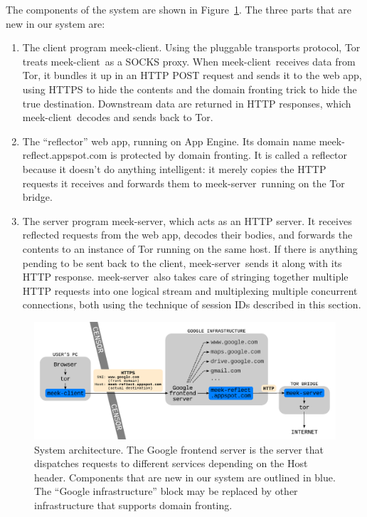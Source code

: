 \documentclass{article}
\def\meekclient{\mbox{meek-client}}
\def\meekserver{\mbox{meek-server}}
\begin{document}
The components of the system are shown in Figure~\ref{fig:architecture}.
The three parts that are new in our system are:
\begin{enumerate}
\item The client program \meekclient.
Using the pluggable transports protocol, Tor treats \meekclient\ as a SOCKS proxy.
When \meekclient\ receives data from Tor, it bundles it up in an HTTP POST
request and sends it to the web app,
using HTTPS to hide the contents and the domain fronting trick to hide the true destination.
Downstream data are returned in HTTP responses, which \meekclient\ decodes and sends back to Tor.
\item The ``reflector'' web app, running on App Engine.
Its domain name \mbox{meek-reflect.appspot.com} is protected by domain fronting.
It is called a reflector because it doesn't do anything intelligent:
it merely copies the HTTP requests it receives and forwards them
to \meekserver\ running on the Tor bridge.
\item The server program \meekserver, which acts as an HTTP server.
It receives reflected requests from the web app, decodes their bodies,
and forwards the contents to an instance of Tor running on the same host.
If there is anything pending to be sent back to the client,
\meekserver\ sends it along with its HTTP response.
\meekserver\ also takes care of stringing together multiple HTTP requests
into one logical stream and multiplexing multiple concurrent connections,
both using the technique of session IDs described in this section.
\end{enumerate}

\begin{figure}
\centering
\includegraphics[width=\linewidth]{architecture}
\caption{
System architecture.
The Google frontend server is the server that dispatches requests to different services depending on the Host header.
Components that are new in our system are outlined in blue.
The ``Google infrastructure'' block may be replaced by other infrastructure that supports domain fronting.
}
\label{fig:architecture}
\end{figure}
\end{document}
